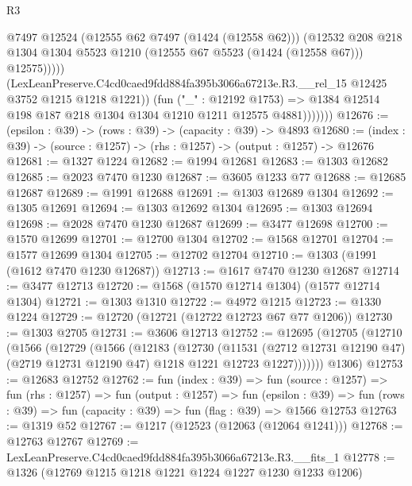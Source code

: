 \begin{lexlean}{R3}
\begin{coremodule}
                          @7497
                          @12524
                          (@12555 @62 @7497 (@1424 (@12558 @62)))
                          (@12532
                            @208
                            @218
                            @1304
                            @1304
                            @5523
                            @1210
                            (@12555 @67 @5523 (@1424 (@12558 @67)))
                            @12575)))))
                  (LexLeanPreserve.C4cd0caed9fdd884fa395b3066a67213e.R3.__rel_15
                    @12425
                    @3752
                    @1215
                    @1218
                    @1221))
                (fun ("_" : @12192 @1753) =>
                @1384 @12514 @198 @187 @218 @1304 @1304 @1210 @1211 @12575 @4881)))))))
@12676 := (epsilon : @39) -> (rows : @39) -> (capacity : @39) -> @4893
@12680 := (index : @39) -> (source : @1257) -> (rhs : @1257) -> (output : @1257) -> @12676
@12681 := @1327 @1224
@12682 := @1994 @12681
@12683 := @1303 @12682
@12685 := @2023 @7470 @1230
@12687 := @3605 @1233 @77
@12688 := @12685 @12687
@12689 := @1991 @12688
@12691 := @1303 @12689 @1304
@12692 := @1305 @12691
@12694 := @1303 @12692 @1304
@12695 := @1303 @12694
@12698 := @2028 @7470 @1230 @12687
@12699 := @3477 @12698
@12700 := @1570 @12699
@12701 := @12700 @1304
@12702 := @1568 @12701
@12704 := @1577 @12699 @1304
@12705 := @12702 @12704
@12710 := @1303 (@1991 (@1612 @7470 @1230 @12687))
@12713 := @1617 @7470 @1230 @12687
@12714 := @3477 @12713
@12720 := @1568 (@1570 @12714 @1304) (@1577 @12714 @1304)
@12721 := @1303 @1310
@12722 := @4972 @1215
@12723 := @1330 @1224
@12729 := @12720 (@12721 (@12722 @12723 @67 @77 @1206))
@12730 := @1303 @2705
@12731 := @3606 @12713
@12752 := @12695
    (@12705
      (@12710
        (@1566
          (@12729
            (@1566
              (@12183
                (@12730
                  (@11531
                    (@2712 @12731 @12190 @47)
                    (@2719 @12731 @12190 @47)
                    @1218
                    @1221
                    @12723
                    @1227)))))))
      @1306)
@12753 := @12683 @12752
@12762 := fun (index : @39) =>
  fun (source : @1257) =>
  fun (rhs : @1257) =>
  fun (output : @1257) =>
  fun (epsilon : @39) =>
  fun (rows : @39) => fun (capacity : @39) => fun (flag : @39) => @1566 @12753
@12763 := @1319 @52
@12767 := @1217 (@12523 (@12063 (@12064 @1241)))
@12768 := @12763 @12767
@12769 := LexLeanPreserve.C4cd0caed9fdd884fa395b3066a67213e.R3.__fits_1
@12778 := @1326 (@12769 @1215 @1218 @1221 @1224 @1227 @1230 @1233 @1206)

\end{coremodule}
\end{lexlean}
